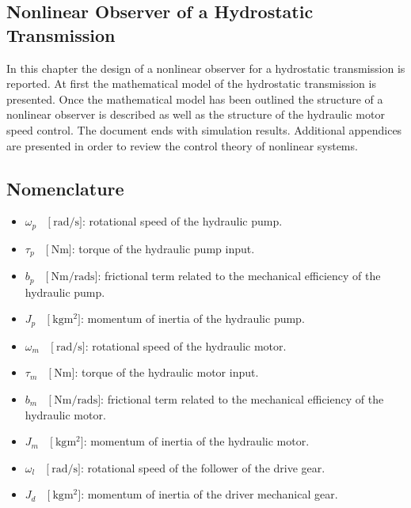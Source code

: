 \documentclass[12pt,a4paper,oneside]{book}
\begin{document}
\begin{onehalfspace}
	
\chapter{Nonlinear Observer of a Hydrostatic Transmission}	
	In this chapter the design of a nonlinear observer for 
	a hydrostatic transmission is reported. At first the mathematical model of the 
	hydrostatic transmission is presented. Once the mathematical model has been outlined the 
	structure of a nonlinear observer is described as well as the structure of 
	the hydraulic motor speed control. The document ends with simulation 
	results. Additional appendices are presented in order to review the control 
	theory of nonlinear systems.
	
	\section{Nomenclature}
	\begin{itemize}
		\item[--] $\omega_p\quad\Big[\SI{}{\radian\per\second}\Big]$: rotational speed of the hydraulic pump.
		\item[--] $\tau_p\quad\Big[\SI{}{\newton\meter}\Big]$: torque of the hydraulic pump input.
		\item[--] $b_p\quad\Big[\SI{}{\newton\meter\per\radian\second}\Big]$: frictional term related to the mechanical efficiency of the hydraulic pump.
		\item[--] $J_p\quad\Big[\SI{}{\kilogram\square\meter}\Big]$: momentum of inertia of the hydraulic pump.
		\item[--] $\omega_m\quad\Big[\SI{}{\radian\per\second}\Big]$: rotational speed of the hydraulic motor.
		\item[--] $\tau_m\quad\Big[\SI{}{\newton\meter}\Big]$: torque of the hydraulic motor input.
		\item[--] $b_m\quad\Big[\SI{}{\newton\meter\per\radian\second}\Big]$: frictional term related to the mechanical efficiency of the hydraulic motor.
		\item[--] $J_m\quad\Big[\SI{}{\kilogram\square\meter}\Big]$: momentum of inertia of the hydraulic motor.
		\item[--] $\omega_l\quad\Big[\SI{}{\radian\per\second}\Big]$: rotational speed of the follower of the drive gear.
		\item[--] $J_{d}\quad\Big[\SI{}{\kilogram\square\meter}\Big]$: momentum of inertia of the driver mechanical gear.

\end{itemize}
\end{onehalfspace}
\end{document}
